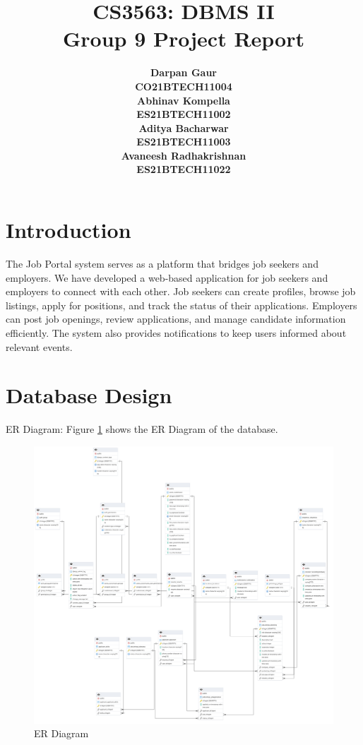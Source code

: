 \documentclass[12pt]{article}
\title{
    \textbf{CS3563: DBMS II} \\ 
    \textbf{Group 9 Project Report} \\
}
\author{
    \small
    \begin{tabular}{c}
        \textbf{Darpan Gaur} \\
        \textbf{CO21BTECH11004}
    \end{tabular}
    \begin{tabular}{c}
        \textbf{Abhinav Kompella} \\
        \textbf{ES21BTECH11002}
    \end{tabular}
    \begin{tabular}{c}
        \textbf{Aditya Bacharwar} \\
        \textbf{ES21BTECH11003}
    \end{tabular}
    \begin{tabular}{c}
        \textbf{Avaneesh Radhakrishnan} \\
        \textbf{ES21BTECH11022}
    \end{tabular}
}
\date{}
\begin{document}
\maketitle

\hrulefill

\section*{Introduction}
The Job Portal system serves as a platform that bridges job seekers and employers. We have developed a web-based application for job seekers and employers to connect with each other. Job seekers can create profiles, browse job listings, apply for positions, and track the status of their applications. Employers can post job openings, review applications, and manage candidate information efficiently. The system also provides notifications to keep users informed about relevant events.

\section*{Database Design}
ER Diagram: Figure \ref{fig:ER Diagram} shows the ER Diagram of the database.
\begin{figure}[h]
    \centering
    \includegraphics[width=1.0\textwidth]{../images/ERD.png}
    \caption{ER Diagram}
    \label{fig:ER Diagram}
\end{figure}
\end{document}
